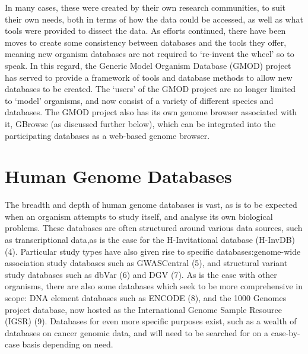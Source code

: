 In many cases, these were created by their own research communities, to suit their own needs, both in terms of how the data could be accessed, as well as what tools were provided to dissect the data. As efforts continued, there have been moves to create some consistency between databases and the tools they offer, meaning new organism databases are not required to ‘re-invent the wheel’ so to speak. In this regard, the Generic Model Organism Database (GMOD) project has served to provide a framework of tools and database methods to allow new databases to be created. The ‘users’ of the GMOD project are no longer limited to ‘model’ organisms, and now consist of a variety of different species and databases. The GMOD project also has its own genome browser associated with it, GBrowse (as discussed further below), which can be integrated into the participating databases as a web-based genome browser\cite{ranganathan2018encyclopedia}.


\section{Human Genome Databases}
The breadth and depth of human genome databases is vast, as is to be expected when an organism attempts to study itself, and
analyse its own biological problems. These databases are often structured around various data sources, such as transcriptional data,as is the case for the H-Invitational database (H-InvDB) (4). Particular study types have also given rise to specific databases:genome-wide association study databases such as GWASCentral (5), and structural variant study databases such as dbVar (6) and DGV (7). As is the case with other organisms, there are also some databases which seek to be more comprehensive in scope: DNA element databases such as ENCODE (8), and the 1000 Genomes project database, now hosted as the International Genome Sample Resource (IGSR) (9). Databases for even more specific purposes exist, such as a wealth of databases on cancer genomic data, and will need to be searched for on a case-by-case basis depending on need.


